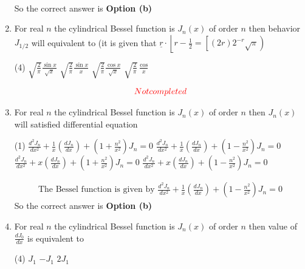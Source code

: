 \begin{enumerate}[label=\color{ocre}\textbf{\arabic*.}]
\begin{answer}
\begin{align*}
	\end{align*}
		So the correct answer is \textbf{Option (b)}
\end{answer}
\item For real $n$ the cylindrical Bessel function is $J_{n}(x)$ of order $n$ then behavior $J_{1 / 2}$ will equivalent to (it is given that $\underline{r} \cdot\left\lfloor r-\frac{1}{2}=\left[(2 r) 2^{-r} \sqrt{\pi}\right)\right.$
 \begin{tasks}(4)
	\task[\textbf{a.}] $\sqrt{\frac{2}{\pi}} \frac{\sin x}{\sqrt{x}}$
	\task[\textbf{b.}]$\sqrt{\frac{2}{\pi}} \frac{\sin x}{x}$
	\task[\textbf{c.}]$\sqrt{\frac{2}{\pi}} \frac{\cos x}{\sqrt{x}}$
	\task[\textbf{d.}] $\sqrt{\frac{2}{\pi}} \frac{\cos }{x}$
\end{tasks} 
\begin{answer}
	\begin{align*}
	{{\color{red}{Not completed}}}\\
	\end{align*}
\end{answer}
\item For real $n$ the cylindrical Bessel function is $J_{n}(x)$ of order $n$ then $J_{n}(x)$ will satisfied differential equation
 \begin{tasks}(1)
	\task[\textbf{a.}]$\frac{d^{2} J_{n}}{d x^{2}}+\frac{1}{x}\left(\frac{d J_{n}}{d x}\right)+\left(1+\frac{n^{2}}{x^{2}}\right) J_{n}=0$
	\task[\textbf{b.}] $\frac{d^{2} J_{n}}{d x^{2}}+\frac{1}{x}\left(\frac{d J_{n}}{d x}\right)+\left(1-\frac{n^{2}}{x^{2}}\right) J_{n}=0$
	\task[\textbf{c.}] $\frac{d^{2} J_{n}}{d x^{2}}+x\left(\frac{d J_{n}}{d x}\right)+\left(1+\frac{n^{2}}{x^{2}}\right) J_{n}=0$
	\task[\textbf{d.}] $\frac{d^{2} J_{n}}{d x^{2}}+x\left(\frac{d J_{n}}{d x}\right)+\left(1-\frac{n^{2}}{x^{2}}\right) J_{n}=0$
\end{tasks}
\begin{answer}
	\begin{align*}
\text{The Bessel function is given by }\frac{d^{2} J_{n}}{d x^{2}}+\frac{1}{x}\left(\frac{d J_{n}}{d x}\right)+\left(1-\frac{n^{2}}{x^{2}}\right) J_{n}=0
	\end{align*}
		So the correct answer is \textbf{Option (b)}
\end{answer}
\item For real $n$ the cylindrical Bessel function is $J_{n}(x)$ of order $n$ then value of $\frac{d J_{0}}{d x}$ is equivalent to 
 \begin{tasks}(4)
	\task[\textbf{a.}] $J_{1}$
	\task[\textbf{b.}]$-J_{1}$
	\task[\textbf{c.}]$2 J_{1}$

\end{tasks}
\end{enumerate}
